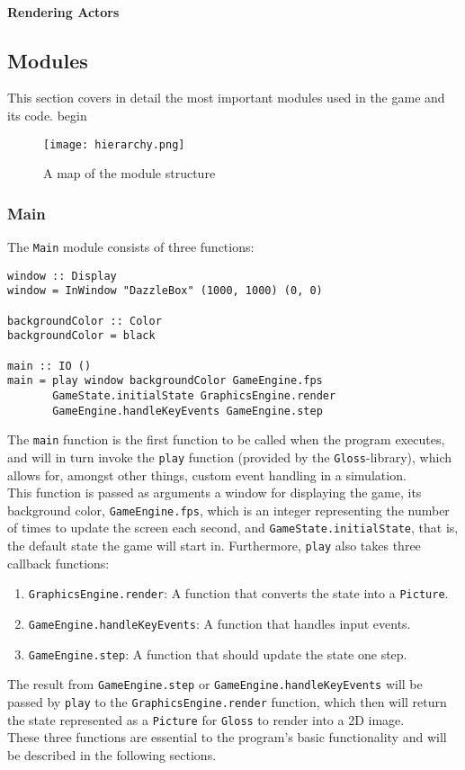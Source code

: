 \documentclass{article}
\begin{document}
		\paragraph{Rendering Actors}
		\newpage
    	\subsection{Modules}
        This section covers in detail the most important modules used in the game and its code.
begin

\begin{figure}[h]
\texttt{[image: hierarchy.png]}
\caption{A map of the module structure}
\end{figure}

\subsubsection{Main}
        The \texttt{Main} module consists of three functions:
        \begin{verbatim}
window :: Display
window = InWindow "DazzleBox" (1000, 1000) (0, 0)

backgroundColor :: Color
backgroundColor = black

main :: IO ()
main = play window backgroundColor GameEngine.fps
       GameState.initialState GraphicsEngine.render
       GameEngine.handleKeyEvents GameEngine.step
        \end{verbatim}

		\noindent The \texttt{main} function is the first function to be called when the program executes, and will in turn invoke the \texttt{play} function (provided by the \texttt{Gloss}-library), which allows for, amongst other things, custom event handling in a simulation. \\
        \newline
        This function is passed as arguments a window for displaying the game, its background color, \texttt{GameEngine.fps}, which is an integer representing the number of times to update the screen each second, and \texttt{GameState.initialState}, that is, the default state the game will start in. Furthermore, \texttt{play} also takes three callback functions:
        \begin{enumerate}
        \item \texttt{GraphicsEngine.render}: A function that converts the state into a \texttt{Picture}.
        \item \texttt{GameEngine.handleKeyEvents}: A function that handles input events.
        \item \texttt{GameEngine.step}: A function that should update the state one step.
        \end{enumerate}
        The result from \texttt{GameEngine.step} or \texttt{GameEngine.handleKeyEvents} will be passed by \texttt{play} to the \texttt{GraphicsEngine.render} function, which then will return the state represented as a \texttt{Picture} for \texttt{Gloss} to render into a 2D image. \\
        \newline
		These three functions are essential to the program's basic functionality and will be described in the following sections.
\end{document}
